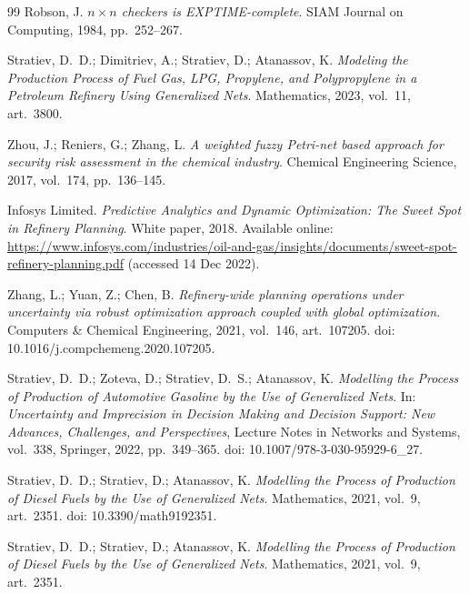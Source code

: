 \begin{thebibliography}{99}
Robson, J.
\newblock \emph{$n \times n$ checkers is EXPTIME-complete}.
\newblock SIAM Journal on Computing, 1984, pp.~252--267.


Stratiev, D.~D.; Dimitriev, A.; Stratiev, D.; Atanassov, K.
\newblock \emph{Modeling the Production Process of Fuel Gas, LPG, Propylene, and Polypropylene in a Petroleum Refinery Using Generalized Nets}.
\newblock Mathematics, 2023, vol.~11, art.~3800.

Zhou, J.; Reniers, G.; Zhang, L.
\newblock \emph{A weighted fuzzy Petri-net based approach for security risk assessment in the chemical industry}.
\newblock Chemical Engineering Science, 2017, vol.~174, pp.~136--145.

Infosys Limited.
\newblock \emph{Predictive Analytics and Dynamic Optimization: The Sweet Spot in Refinery Planning}.
\newblock White paper, 2018.
\newblock Available online: \url{https://www.infosys.com/industries/oil-and-gas/insights/documents/sweet-spot-refinery-planning.pdf} (accessed 14 Dec 2022).

Zhang, L.; Yuan, Z.; Chen, B.
\newblock \emph{Refinery-wide planning operations under uncertainty via robust optimization approach coupled with global optimization}.
\newblock Computers \& Chemical Engineering, 2021, vol.~146, art.~107205.
\newblock doi: 10.1016/j.compchemeng.2020.107205.

Stratiev, D.~D.; Zoteva, D.; Stratiev, D.~S.; Atanassov, K.
\newblock \emph{Modelling the Process of Production of Automotive Gasoline by the Use of Generalized Nets}.
\newblock In: \emph{Uncertainty and Imprecision in Decision Making and Decision Support: New Advances, Challenges, and Perspectives},
Lecture Notes in Networks and Systems, vol.~338, Springer, 2022, pp.~349--365.
\newblock doi: 10.1007/978-3-030-95929-6\_27.

Stratiev, D.~D.; Stratiev, D.; Atanassov, K.
\newblock \emph{Modelling the Process of Production of Diesel Fuels by the Use of Generalized Nets}.
\newblock Mathematics, 2021, vol.~9, art.~2351.
\newblock doi: 10.3390/math9192351.

Stratiev, D.~D.; Stratiev, D.; Atanassov, K.
\newblock \emph{Modelling the Process of Production of Diesel Fuels by the Use of Generalized Nets}.
\newblock Mathematics, 2021, vol.~9, art.~2351.


\end{thebibliography}

